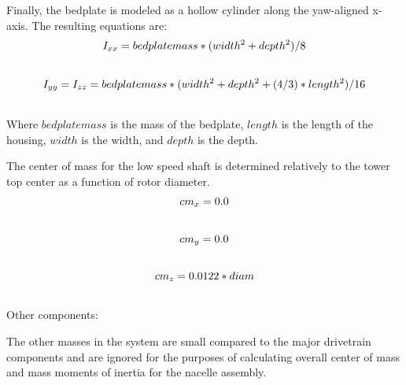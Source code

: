 \documentclass[letterpaper,10pt,openany,oneside]{sphinxmanual}
\begin{document}
Finally, the bedplate is modeled as a hollow cylinder along the yaw-aligned x-axis.  The resulting equations are:
\begin{gather}
\begin{split}I_{xx}=bedplatemass * (width^2 + depth^2) / 8\end{split}\notag\\\begin{split}\end{split}\notag
\end{gather}\begin{gather}
\begin{split}I_{yy}=I_{zz}=bedplatemass * (width^2 + depth^2 + (4/3)*length^2) / 16\end{split}\notag\\\begin{split}\end{split}\notag
\end{gather}
Where $bedplatemass$ is the mass of the bedplate, $length$ is the length of the housing, $width$ is the width, and $depth$ is the depth.

The center of mass for the low speed shaft is determined relatively to the tower top center as a function of rotor diameter.
\begin{gather}
\begin{split}cm_{x} = 0.0\end{split}\notag\\\begin{split}\end{split}\notag
\end{gather}\begin{gather}
\begin{split}cm_{y} = 0.0\end{split}\notag\\\begin{split}\end{split}\notag
\end{gather}\begin{gather}
\begin{split}cm_{z} = 0.0122 * diam\end{split}\notag\\\begin{split}\end{split}\notag
\end{gather}
Other components:

The other masses in the system are small compared to the major drivetrain components and are ignored for the purposes of calculating overall center of mass and mass moments of inertia for the nacelle assembly.
\end{document}
